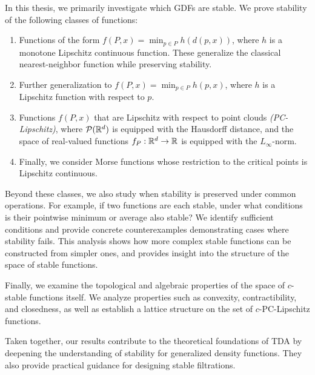 In this thesis, we primarily investigate which GDFs are
stable. We prove stability of the following classes of functions:
\begin{enumerate}
    \item Functions of the form $f(P, x) = \min_{p \in P} h(d(p, x))$, where $h$
          is a monotone Lipschitz continuous function. These generalize the
          classical nearest-neighbor function while preserving stability.
    \item Further generalization to $f(P, x) = \min_{p \in P} h(p, x)$, where
          $h$ is a Lipschitz function with respect to $p$.
    \item Functions $f(P, x)$ that are Lipschitz with respect to point clouds
          \emph{(PC-Lipschitz)}, where $\mathcal{P}(\mathbb{R}^d)$ is equipped with the
          Hausdorff distance, and the space of real-valued functions $f_P : \mathbb{R}^d
          \to \mathbb{R}$ is equipped with the $L_\infty$-norm.
    \item Finally, we consider Morse functions whose restriction to the critical
          points is Lipschitz continuous.
\end{enumerate}

Beyond these classes, we also study when stability is preserved under common
operations. For example, if two functions are each stable, under what conditions
is their pointwise minimum or average also stable? We identify sufficient
conditions and provide concrete counterexamples demonstrating cases where
stability fails. This analysis shows how more complex stable functions can be
constructed from simpler ones, and provides insight into the structure of the
space of stable functions.

Finally, we examine the topological and algebraic properties of the space of
$c$-stable functions itself. We analyze properties such as convexity,
contractibility, and closedness, as well as establish a lattice structure on the
set of $c$-PC-Lipschitz functions.

Taken together, our results contribute to the theoretical foundations of TDA by
deepening the understanding of stability for generalized density functions. They
also provide practical guidance for designing stable filtrations.



